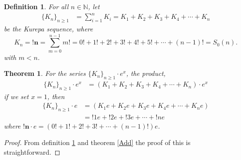 \documentclass[pdflatex,sn-mathphys-num]{sn-jnl}%
\newtheorem{theorem}{Theorem}
\newtheorem{definition}{Definition}
\theoremstyle{thmstyleone}%
\theoremstyle{thmstyletwo}%
\theoremstyle{thmstylethree}%
\begin{document}
\begin{definition}\label{Seq}
    For all $n\in \mathbb{N}$, let  
    \begin{align*}
        \lbrace K_n\rbrace_{n\geq 1}&=\sum_{i=1}^{n}K_i=K_1 + K_2 + K_3 +K_4 +\cdots + K_n
    \end{align*}
 be the Kurepa sequence, 
where  $$K_n=\mathbf{!n}=\sum_{m=0}^{n-1}m!= 0! + 1!+ 2! + 3! + 4!+ 5!  + \cdots +(n-1)!=S_0(n).$$ with $m<n$.
\end{definition}
\begin{theorem}\label{dobi}
For the series $\lbrace K_n\rbrace_{n\geq 1}\cdotp e^{x}$, the product,
 \begin{align*}
     \lbrace K_n\rbrace_{n\geq 1}\cdotp e^{x}&= (K_1 + K_2 + K_3 +K_4 +\cdots + K_n)\cdotp e^{x}
 \end{align*}
if we set $x=1$, then
 \begin{align*}
     \lbrace K_n\rbrace_{n\geq 1}\cdotp e&= (K_1e + K_2e + K_3e +K_4e +\cdots + K_ne)\\
     & =!1e + !2e + !3e + \cdots + !ne
 \end{align*}
 where 
$\mathbf{!n} \cdotp e = \left(0! +1! + 2! + 3! + \cdots + (n-1)!\right) e $. 


\end{theorem}

\begin{proof}
From definition \ref{Seq} and theorem \ref{Add} the proof of this is straightforward.
    
\end{proof}
\end{document}
